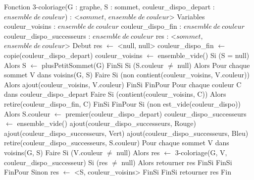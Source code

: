 \begin{algorithm}[caption={3-coloriage}] \label{alg:3color}
    Fonction 3-coloriage(G : graphe, S : sommet,
        couleur_dispo_depart : $ensemble\ de\ couleur$) : <$sommet$, $ensemble\ de\ couleur$>
    Variables
        couleur_voisins : $ensemble\ de\ couleur$
        couleur_dispo_fin : $ensemble\ de\ couleur$
        couleur_dispo_successeurs : $ensemble\ de\ couleur$
        res : <$sommet$, $ensemble\ de\ couleur$>
    Debut
        res $\gets$ <null, null>
        couleur_dispo_fin $\gets$ copie(couleur_dispo_depart)
        couleur_voisins $\gets$ ensemble_vide()
        Si (S = null) Alors
            S $\gets$ plusPetitSommet(G)
        FinSi
        Si (S.couleur $\ne$ null) Alors
            Pour chaque sommet V dans voisins(G, S) Faire
                Si (non contient(couleur_voisins, V.couleur)) Alors
                    ajout(couleur_voisins, V.couleur)
                FinSi
            FinPour
            Pour chaque couleur C dans couleur_dispo_depart Faire
                Si (contient(couleur_voisins, C)) Alors
                    retire(couleur_dispo_fin, C)
                FinSi
            FinPour
            Si (non est_vide(couleur_dispo)) Alors
                S.couleur $\gets$ premier(couleur_dispo_depart)
                couleur_dispo_successeurs $\gets$ ensemble_vide()
                ajout(couleur_dispo_successeurs, Rouge)
                ajout(couleur_dispo_successeurs, Vert)
                ajout(couleur_dispo_successeurs, Bleu)
                retire(couleur_dispo_successeurs, S.couleur)
                Pour chaque sommet V dans voisins(G, S) Faire
                    Si (V.couleur $\ne$ null) Alors
                        res $\gets$ 3-coloriage(G, V, couleur_dispo_successeur)
                        Si (res $\ne$ null) Alors
                            retourner res
                        FinSi
                    FinSi
                FinPour
            Sinon
                res $\gets$ <S, couleur_voisins>
            FinSi
        FinSi
        retourner res
    Fin
\end{algorithm}